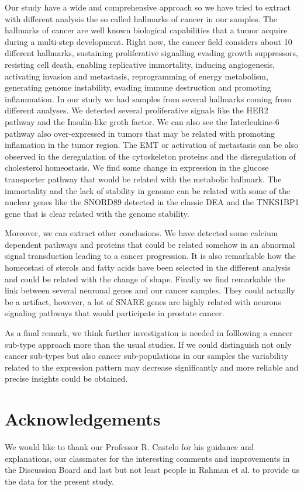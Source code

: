 \documentclass[9pt,twocolumn,twoside]{gsajnl}
\begin{document}
Our study have a wide and comprehensive approach so we have tried to extract with different analysis the so called hallmarks of cancer in our samples. The hallmarks of cancer are well known biological capabilities that a tumor acquire during a multi-step development. Right now, the cancer field considers about 10 different hallmarks, sustaining proliferative signalling
evading growth suppressors, resisting cell death, enabling replicative immortality, inducing angiogenesis, activating invasion and metastasis,
reprogramming of energy metabolism, generating genome instability,  evading immune destruction and promoting inflammation\citep{hanahan2011hallmarks}. In our study we had samples from several hallmarks coming from different analyses. We detected several proliferative signals like the HER2 pathway and the Insulin-like groth factor. We can also see the Interleukine-6 pathway also over-expressed in tumors that may be related with promoting inflamation in the tumor region. The EMT or activation of metastasis can be also observed in the deregulation of the cytoskeleton proteins and the disregulation of cholesterol homeostasis. We find some change in expression in the glucose transporter pathway that would be related with the metabolic hallmark. The immortality and the lack of stability in genome can be related with some of the nuclear genes like the SNORD89 detected in the classic DEA and the TNKS1BP1 gene that is clear related with the genome stability. 

Moreover, we can extract other conclusions. We have detected some calcium dependent pathways and proteins that could be related somehow in an abnormal signal transduction leading to a cancer progression. It is also remarkable how the homeostasi of sterols and fatty acids have been selected in the different analysis and could be related with the change of shape. Finally we find remarkable the link between several neuronal genes and our cancer samples. They could actually be a artifact, however, a lot of SNARE genes are highly related with neurons signaling pathways that would participate in prostate cancer. 

As a final remark, we think further investigation is needed in folllowing a cancer sub-type approach more than the usual studies. If we could distinguish not only cancer sub-types but also cancer sub-populations in our samples the variability related to the expression pattern may decrease significantly and more reliable and precise insights could be obtained.

\section*{Acknowledgements}

We would like to thank our Professor R. Castelo for his guidance and explanations, our classmates for the interesting comments and improvements in the Discussion Board and last but not least people in Rahman et al. \cite{Rahman15112015} to provide us the data for the present study. 



\end{document}
